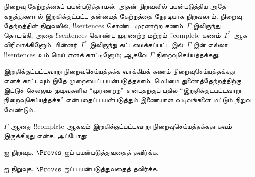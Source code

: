 \documentclass[../../../include/open-logic-section]{subfiles}
\begin{document}
      {}
      {}


நிறைவு தேற்றத்தைப் பயன்படுத்தாமல், அதன் நிறுவலில் பயன்படுத்திய அதே
கருத்துகளால் இறுதிக்குட்பட்ட தன்மைத் தேற்றத்தை நேரடியாக நிறுவலாம். நிறைவு
தேற்றத்தின் நிறுவலில், !!{sentence}s கொண்ட முரணற்ற கணம்~$\Gamma$ இலிருந்து
தொடங்கி, அதை !!{sentence}s கொண்ட முரணற்ற மற்றும்
!!{complete} கணம்~$\Gamma^*$ ஆக விரிவாக்கினோம். பின்னர்~$\Gamma^*$ இலிருந்து
கட்டமைக்கப்பட்ட
இல்~$\Gamma$ இன் எல்லா !!{sentence}s உம் மெய் எனக் காட்டினோம்; ஆகவே
$\Gamma$ நிறைவுசெய்யத்தக்கது.

இறுதிக்குட்பட்டவாறு நிறைவுசெய்யத்தக்க வாக்கியக் கணம் நிறைவுசெய்யத்தக்கது
எனக் காட்டவும் இதே முறையைப் பயன்படுத்தலாம். மெய்மை துணைத்தேற்றத்திற்கு
இட்டுச் செல்லும் முடிவுகளில் ``முரணற்ற'' என்பதற்குப் பதில்
``இறுதிக்குட்பட்டவாறு நிறைவுசெய்யத்தக்க'' என்பதைப் பயன்படுத்தும் இணையான
வடிவங்களை மட்டும் நிறுவ வேண்டும்.

\begin{prop}
$\Gamma$ ஆனது !!{complete} ஆகவும் இறுதிக்குட்பட்டவாறு
நிறைவுசெய்யத்தக்கதாகவும் இருக்கிறது என்க. அப்போது:
\begin{enumerate}


\end{enumerate}
\end{prop}

\begin{prob}
 ஐ நிறுவுக. $\Proves$ ஐப்
பயன்படுத்துவதைத் தவிர்க்க.
\end{prob}
\tagendprob

\begin{prob}
 ஐ நிறுவுக. $\Proves$ ஐப்
பயன்படுத்துவதைத் தவிர்க்க.
\end{prob}
\tagendprob
\end{document}
